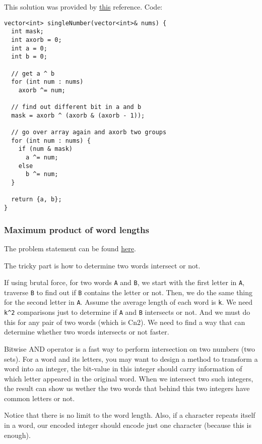 \documentclass[12pt]{article}
\begin{document}
This solution was provided by \href{https://leetcode.com/problems/single-number-iii/discuss/68998/How-to-use-bit-manipulation-to-solve-this-problem}{this} reference.
Code:
\begin{verbatim}
vector<int> singleNumber(vector<int>& nums) {
  int mask;
  int axorb = 0;
  int a = 0;
  int b = 0;

  // get a ^ b
  for (int num : nums)
    axorb ^= num;

  // find out different bit in a and b
  mask = axorb ^ (axorb & (axorb - 1));

  // go over array again and axorb two groups
  for (int num : nums) {
    if (num & mask)
      a ^= num;
    else 
      b ^= num;
  }

  return {a, b};
}

\end{verbatim}

\subsubsection{Maximum product of word lengths}
\label{sec:orgf748601}
The problem statement can be found \href{https://leetcode.com/problems/maximum-product-of-word-lengths/}{here}.

The tricky part is how to determine two words intersect or not.

If using brutal force, for two words \texttt{A} and \texttt{B}, we start with the first letter in \texttt{A}, traverse \texttt{B} to find out if \texttt{B} contains the letter or not. Then, we do the same thing for the second letter in \texttt{A}. Assume the average length of each word is \texttt{k}. We need \texttt{k\textasciicircum{}2} comparisons just to determine if \texttt{A} and \texttt{B} intersects or not. And we must do this for any pair of two words (which is Cn2). We need to find a way that can determine whether two words intersects or not faster.

Bitwise AND operator is a fast way to perform intersection on two numbers (two sets). For a word and its letters, you may want to design a method to transform a word into an integer, the bit-value in this integer should carry information of which letter appeared in the original word. When we intersect two such integers, the result can show us wether the two words that behind this two integers have common letters or not.

Notice that there is no limit to the word length. Also, if a character repeats itself in a word, our encoded integer should encode just one character (because this is enough).
\end{document}
